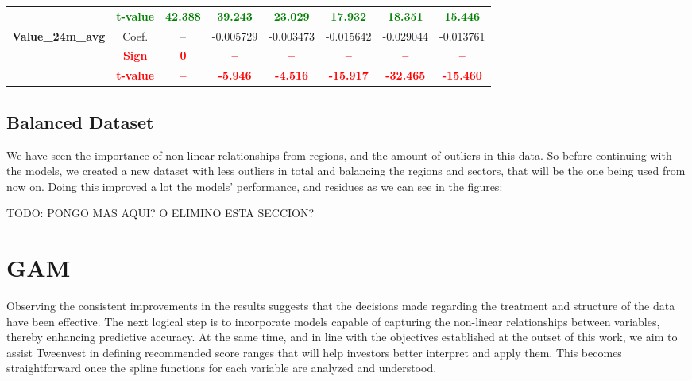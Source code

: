 \documentclass[11pt,english,a4paper,hidelinks]{book}
\begin{document}
\begin{table}[H]
\begin{tabular}{lccccccc}
            & \textbf{\textcolor{green}{t-value}} & \textbf{\textcolor{green}{42.388}}    & \textbf{\textcolor{green}{39.243}}    & \textbf{\textcolor{green}{23.029}}    & \textbf{\textcolor{green}{17.932}}    & \textbf{\textcolor{green}{18.351}}    & \textbf{\textcolor{green}{15.446}}    \\
        \multirow{3}{*}{\textbf{Value\_24m\_avg}} 
            & Coef.   & -- & -0.005729 & -0.003473 & -0.015642 & -0.029044 & -0.013761 \\
            & \textbf{\textcolor{red}{Sign}}    & \textbf{\textcolor{red}{0}}  & \textbf{\textcolor{red}{–}}         & \textbf{\textcolor{red}{–}}         & \textbf{\textcolor{red}{–}}         & \textbf{\textcolor{red}{–}}         & \textbf{\textcolor{red}{–}}         \\
            & \textbf{\textcolor{red}{t-value}} & \textbf{\textcolor{red}{--}} & \textbf{\textcolor{red}{-5.946}}    & \textbf{\textcolor{red}{-4.516}}    & \textbf{\textcolor{red}{-15.917}}   & \textbf{\textcolor{red}{-32.465}}   & \textbf{\textcolor{red}{-15.460}}   \\
        \bottomrule
    \end{tabular}
    \label{tab:africa_middle_east_windowed_consistency_summary}
\end{table}

\subsection{Balanced Dataset}

We have seen the importance of non-linear relationships from regions, and the amount of outliers in this data. So before continuing with the models, we created a new dataset with less outliers in total and balancing the regions and sectors, that will be the one being used from now on. Doing this improved a lot the models' performance, and residues as we can see in the figures: 

TODO: PONGO MAS AQUI? O ELIMINO ESTA SECCION?



\section{GAM}

Observing the consistent improvements in the results suggests that the decisions made regarding the treatment and structure of the data have been effective. The next logical step is to incorporate models capable of capturing the non-linear relationships between variables, thereby enhancing predictive accuracy. At the same time, and in line with the objectives established at the outset of this work, we aim to assist Tweenvest in defining recommended score ranges that will help investors better interpret and apply them. This becomes straightforward once the spline functions for each variable are analyzed and understood.
\vspace{0.5cm}
\end{document}
